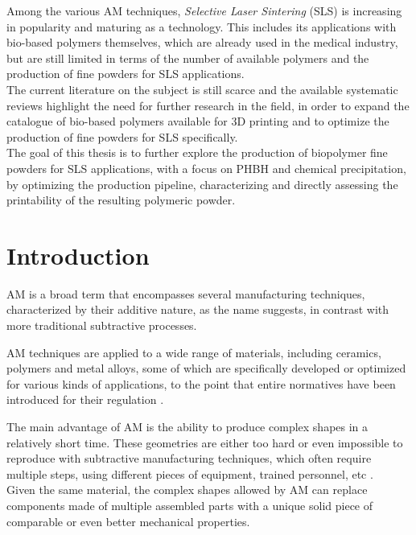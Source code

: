 \documentclass[a4paper]{article}
\begin{document}
    Among the various AM techniques, \textit{Selective Laser Sintering} (SLS) is increasing in popularity and 
    maturing as a technology. This includes its applications with bio-based polymers themselves, which are already used in the medical industry, 
    but are still limited in terms of the number of available polymers and the production of fine powders for SLS applications. \\ 

    The current literature on the subject is still scarce and the available systematic reviews highlight the need for further research in the field, 
    in order to expand the catalogue of bio-based polymers available for 3D printing and to optimize the production of fine powders
    for SLS specifically. \\

    The goal of this thesis is to further explore the production of biopolymer fine powders for SLS applications, with a focus on 
    PHBH and chemical precipitation, by optimizing the production pipeline, characterizing and directly assessing 
    the printability of the resulting polymeric powder. \\  

    \clearpage
    \section{Introduction\label{Intro}}

    AM is a broad term that encompasses several manufacturing techniques, characterized by their additive nature, as the name suggests, 
    in contrast with more traditional subtractive processes.
    
    AM techniques are applied to a wide range of materials, including ceramics, polymers and metal alloys, some of which are specifically developed or optimized for 
    various kinds of applications, to the point that entire normatives have been introduced for their regulation \autocites{ASTM_E3166-20}. 
    
    The main advantage of AM is the ability to produce complex shapes in a relatively short time. 
    These geometries are either too hard or even impossible to reproduce with subtractive manufacturing techniques, which often require multiple steps, using different 
    pieces of equipment, trained personnel, etc \autocites{DechetMaximilianA2020OtDo}. \\

    Given the same material, the complex shapes allowed by AM can replace components made of multiple assembled parts with a unique solid piece of comparable or even better mechanical properties. 
    
\end{document}
